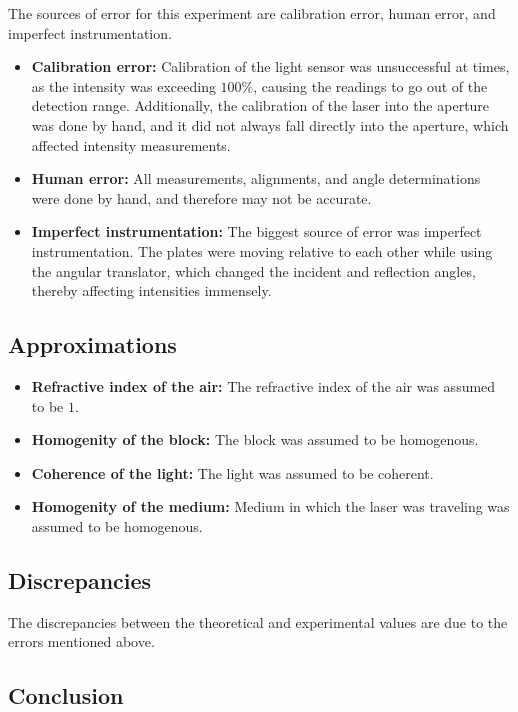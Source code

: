 \documentclass[10pt]{article}
\begin{document}
The sources of error for this experiment are calibration error, human error, and imperfect instrumentation.
\begin{itemize}
  \item \textbf{Calibration error:} Calibration of the light sensor was unsuccessful at times, as the intensity was exceeding $100\%$, causing the readings to go out of the detection range. Additionally, the calibration of the laser into the aperture was done by hand, and it did not always fall directly into the aperture, which affected intensity measurements.
  \item \textbf{Human error:} All measurements, alignments, and angle determinations were done by hand, and therefore may not be accurate.
  \item \textbf{Imperfect instrumentation:} The biggest source of error was imperfect instrumentation. The plates were moving relative to each other while using the angular translator, which changed the incident and reflection angles, thereby affecting intensities immensely.
\end{itemize}

\subsection*{Approximations}

\begin{itemize}
  \item \textbf{Refractive index of the air:} The refractive index of the air was assumed to be $1$.
  \item \textbf{Homogenity of the block:} The block was assumed to be homogenous.
  \item \textbf{Coherence of the light:} The light was assumed to be coherent.
  \item \textbf{Homogenity of the medium:} Medium in which the laser was traveling was assumed to be homogenous.
\end{itemize}

\subsection*{Discrepancies}

The discrepancies between the theoretical and experimental values are due to the errors mentioned above. 

\subsection*{Conclusion} 
\end{document}
